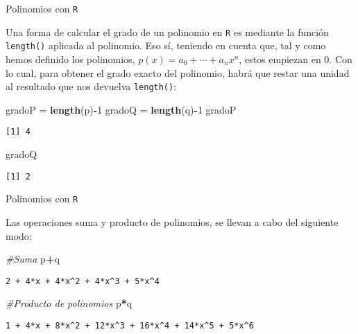 \documentclass[
  ignorenonframetext,
]{beamer}
\newenvironment{Shaded}{\begin{snugshade}}{\end{snugshade}}
\newcommand{\CommentTok}[1]{\textcolor[rgb]{0.56,0.35,0.01}{\textit{#1}}}
\newcommand{\DecValTok}[1]{\textcolor[rgb]{0.00,0.00,0.81}{#1}}
\newcommand{\KeywordTok}[1]{\textcolor[rgb]{0.13,0.29,0.53}{\textbf{#1}}}
\newcommand{\NormalTok}[1]{#1}
\newcommand{\OperatorTok}[1]{\textcolor[rgb]{0.81,0.36,0.00}{\textbf{#1}}}
\newcommand{\StringTok}[1]{\textcolor[rgb]{0.31,0.60,0.02}{#1}}
\begin{document}
\begin{frame}[fragile]{Polinomios con \texttt{R}}
\protect\hypertarget{polinomios-con-r-3}{}

Una forma de calcular el grado de un polinomio en \texttt{R} es mediante
la función \texttt{length()} aplicada al polinomio. Eso sí, teniendo en
cuenta que, tal y como hemos definido los polinomios,
\(p(x)=a_0+\cdots+a_nx^n\), estos empiezan en 0. Con lo cual, para
obtener el grado exacto del polinomio, habrá que restar una unidad al
resultado que nos devuelva \texttt{length()}:

\begin{Shaded}
\begin{Highlighting}[]
\NormalTok{gradoP =}\StringTok{ }\KeywordTok{length}\NormalTok{(p)}\OperatorTok{-}\DecValTok{1}
\NormalTok{gradoQ =}\StringTok{ }\KeywordTok{length}\NormalTok{(q)}\OperatorTok{-}\DecValTok{1}
\NormalTok{gradoP}
\end{Highlighting}
\end{Shaded}

\begin{verbatim}
[1] 4
\end{verbatim}

\begin{Shaded}
\begin{Highlighting}[]
\NormalTok{gradoQ}
\end{Highlighting}
\end{Shaded}

\begin{verbatim}
[1] 2
\end{verbatim}

\end{frame}

\begin{frame}[fragile]{Polinomios con \texttt{R}}
\protect\hypertarget{polinomios-con-r-4}{}

Las operaciones suma y producto de polinomios, se llevan a cabo del
siguiente modo:

\begin{Shaded}
\begin{Highlighting}[]
\CommentTok{#Suma}
\NormalTok{p}\OperatorTok{+}\NormalTok{q}
\end{Highlighting}
\end{Shaded}

\begin{verbatim}
2 + 4*x + 4*x^2 + 4*x^3 + 5*x^4 
\end{verbatim}

\begin{Shaded}
\begin{Highlighting}[]
\CommentTok{#Producto de polinomios}
\NormalTok{p}\OperatorTok{*}\NormalTok{q}
\end{Highlighting}
\end{Shaded}

\begin{verbatim}
1 + 4*x + 8*x^2 + 12*x^3 + 16*x^4 + 14*x^5 + 5*x^6 
\end{verbatim}

\end{frame}
\end{document}
